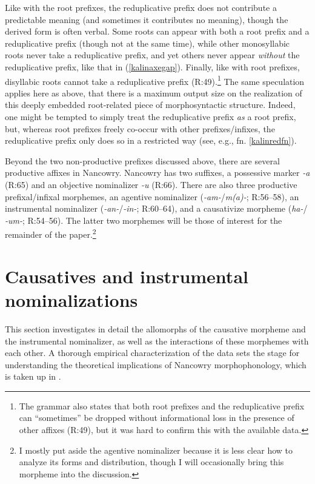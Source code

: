 \documentclass[output=paper]{langscibook}
\begin{document}
\noindent Like with the root prefixes, the reduplicative prefix does not contribute a predictable meaning (and sometimes it contributes no meaning), though the derived form is often verbal. Some roots can appear with both a root prefix and a reduplicative prefix (though not at the same time), while other monosyllabic roots never take a reduplicative prefix, and yet others never appear \textit{without} the reduplicative prefix, like that in (\ref{kalinaxegap}). Finally, like with root prefixes, disyllabic roots cannot take a reduplicative prefix (R:49).\footnote{The grammar also states that both root prefixes and the reduplicative prefix can ``sometimes'' be dropped without informational loss in the presence of other affixes (R:49), but it was hard to confirm this with the available data.} The same speculation applies here as above, that there is a maximum output size on the realization of this deeply embedded root-related piece of morphosyntactic structure. Indeed, one might be tempted to simply treat the reduplicative prefix {\it as} a root prefix, but, whereas root prefixes freely co-occur with other  prefixes/infixes, the reduplicative prefix only does so in a restricted way (see, e.g., fn. \ref{kalinredfn}).

Beyond the two non-productive prefixes discussed above, there are several productive affixes in Nancowry. Nancowry has two suffixes, a possessive marker \textit{-a} (R:65) and an objective nominalizer \textit{-u} (R:66). There are also three productive prefixal/infixal morphemes, an agentive nominalizer (\textit{-am-}/\textit{m(a)-}; R:56--58), an instrumental nominalizer (\textit{-an-}/\textit{-in-}; R:60--64), and a causativize morpheme (\textit{ha-}/ \textit{-um-}; R:54--56). The latter two morphemes will be those of interest for the remainder of the paper.\footnote{I mostly put aside the agentive nominalizer because it is less clear how to analyze its forms and distribution, though I will occasionally bring this morpheme into the discussion.}

\section{Causatives and instrumental nominalizations}\label{sec:kalin:3}

This section investigates in detail the allomorphs of the causative morpheme and the instrumental nominalizer, as well as the interactions of these morphemes with each other. A thorough empirical characterization of the data sets the stage for understanding the theoretical implications of Nancowry morphophonology, which is taken up in .
\end{document}
